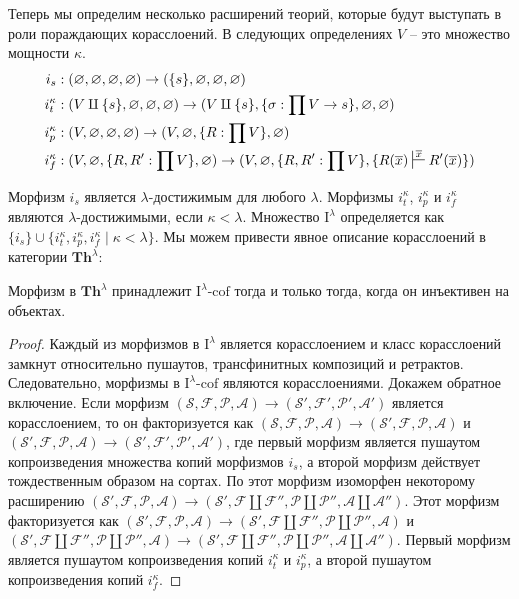\documentclass[reqno]{amsart}
\theoremstyle{definition}
\theoremstyle{remark}
\newcommand{\bcat}[1]{\mathbf{#1}}
\newcommand{\Th}{\bcat{Th}}
\newcommand{\I}{\mathrm{I}}
\newcommand{\class}[2]{#1\text{-}\mathrm{#2}}
\newcommand{\Icof}[1][\I]{\class{#1}{cof}}
\begin{document}
Теперь мы определим несколько расширений теорий, которые будут выступать в роли пораждающих корасслоений.
В следующих определениях $V$ -- это множество мощности $\kappa$.
\begin{align*}
i_s & : (\varnothing,\varnothing,\varnothing,\varnothing) \to (\{ s \},\varnothing,\varnothing,\varnothing) \\
i_t^\kappa & : (V \amalg \{ s \}, \varnothing, \varnothing, \varnothing) \to (V \amalg \{ s \}, \{ \sigma : \prod V \to s \}, \varnothing, \varnothing) \\
i_p^\kappa & : (V, \varnothing, \varnothing, \varnothing) \to (V, \varnothing, \{ R : \prod V \}, \varnothing) \\
i_f^\kappa & : (V, \varnothing, \{ R, R' : \prod V \}, \varnothing) \to (V, \varnothing, \{ R, R' : \prod V \}, \{ R(\overline{x}) \sststile{}{\overline{x}} R'(\overline{x}) \})
\end{align*}

Морфизм $i_s$ является $\lambda$-достижимым для любого $\lambda$.
Морфизмы $i_t^\kappa$, $i_p^\kappa$ и $i_f^\kappa$ являются $\lambda$-достижимыми, если $\kappa < \lambda$.
Множество $\I^\lambda$ определяется как $\{ i_s \} \cup \{ i_t^\kappa, i_p^\kappa, i_f^\kappa \mid \kappa < \lambda \}$.
Мы можем привести явное описание корасслоений в категории $\Th^\lambda$:

\begin{prop}[th-cof]
Морфизм в $\Th^\lambda$ принадлежит $\Icof[\I^\lambda]$ тогда и только тогда, когда он инъективен на объектах.
\end{prop}
\begin{proof}
Каждый из морфизмов в $\I^\lambda$ является корасслоением и класс корасслоений замкнут относительно пушаутов, трансфинитных композиций и ретрактов.
Следовательно, морфизмы в $\Icof[\I^\lambda]$ являются корасслоениями.
Докажем обратное включение.
Если морфизм $(\mathcal{S},\mathcal{F},\mathcal{P},\mathcal{A}) \to (\mathcal{S}',\mathcal{F}',\mathcal{P}',\mathcal{A}')$ является корасслоением,
то он факторизуется как $(\mathcal{S},\mathcal{F},\mathcal{P},\mathcal{A}) \to (\mathcal{S}',\mathcal{F},\mathcal{P},\mathcal{A})$ и $(\mathcal{S}',\mathcal{F},\mathcal{P},\mathcal{A}) \to (\mathcal{S}',\mathcal{F}',\mathcal{P}',\mathcal{A}')$,
где первый морфизм является пушаутом копроизведения множества копий морфизмов $i_s$, а второй морфизм действует тождественным образом на сортах.
По  этот морфизм изоморфен некоторому расширению $(\mathcal{S}',\mathcal{F},\mathcal{P},\mathcal{A}) \to (\mathcal{S}', \mathcal{F} \amalg \mathcal{F}'', \mathcal{P} \amalg \mathcal{P}'', \mathcal{A} \amalg \mathcal{A}'')$.
Этот морфизм факторизуется как $(\mathcal{S}',\mathcal{F},\mathcal{P},\mathcal{A}) \to (\mathcal{S}', \mathcal{F} \amalg \mathcal{F}'', \mathcal{P} \amalg \mathcal{P}'', \mathcal{A})$ и
$(\mathcal{S}', \mathcal{F} \amalg \mathcal{F}'', \mathcal{P} \amalg \mathcal{P}'', \mathcal{A}) \to (\mathcal{S}', \mathcal{F} \amalg \mathcal{F}'', \mathcal{P} \amalg \mathcal{P}'', \mathcal{A} \amalg \mathcal{A}'')$.
Первый морфизм является пушаутом копроизведения копий $i_t^\kappa$ и $i_p^\kappa$, а второй пушаутом копроизведения копий $i_f^\kappa$.
\end{proof}
\end{document}

